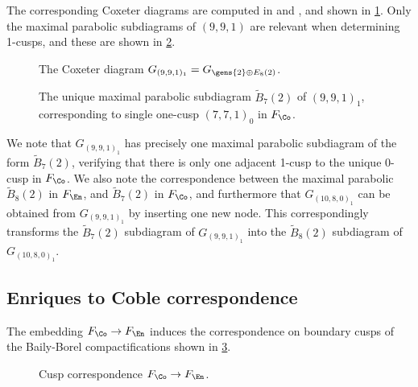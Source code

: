 \documentclass[../main.tex]{subfiles}
\begin{document}
The corresponding Coxeter diagrams are computed in \cite{AN06} and \cite{AEGS23}, and shown in \cref{fig:coble-coxeter-diagrams}. Only the maximal parabolic subdiagrams of $(9, 9, 1)$ are relevant when determining 1-cusps, and these are shown in \cref{fig:coble-cusp-9-9-1-parabolics}.

\begin{figure}[H]
\centering

    \caption{The Coxeter diagram $G_{(9,9,1)_1} = G_{\gens{2} \oplus E_8(2)}$.}
    \label{fig:coble-coxeter-diagrams}
\end{figure}

\begin{figure}[H]
    \centering
    
    \caption{The unique maximal parabolic subdiagram $\tilde B_7(2)$ of $(9,9,1)_1$, corresponding to single one-cusp $(7,7,1)_0$ in $F_\Co$.}
    \label{fig:coble-cusp-9-9-1-parabolics}
\end{figure}

We note that $G_{(9, 9, 1)_1}$ has precisely one maximal parabolic subdiagram of the form $\tilde B_7(2)$, verifying that there is only one adjacent 1-cusp to the unique 0-cusp in $F_\Co$. 
We also note the correspondence between the maximal parabolic $\tilde B_8(2)$ in $F_\En$, and $\tilde B_7(2)$ in $F_\Co$, and furthermore that $G_{(10, 8, 0)_1}$ can be obtained from $G_{(9, 9, 1)_1}$ by inserting one new node. This correspondingly transforms the $\tilde B_7(2)$ subdiagram of $G_{(9, 9, 1)_1}$ into the $\tilde B_8(2)$ subdiagram of $G_{(10, 8, 0)_1}$.

\subsection{Enriques to Coble correspondence}

\begin{theorem}\label{thm:cusp_correspondence}
The embedding $F_\Co\to F_\En$ induces the correspondence on boundary cusps of the Baily-Borel compactifications shown in \cref{fig:enriques-coble-correspondence}.

\begin{figure}[H]
    \centering
    
    \caption{Cusp correspondence $F_\Co \to F_\En$.}
    \label{fig:enriques-coble-correspondence}
\end{figure}

\end{theorem}
\end{document}
